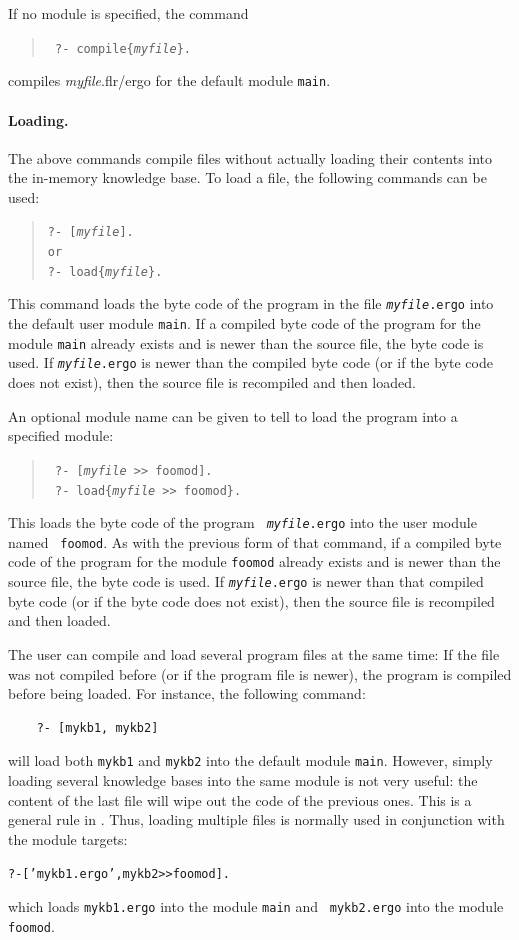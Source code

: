 \documentclass[11pt]{article}
\newcommand{\ERGO}{\mbox{\smaller{\ensuremath{\cal{E}}\smaller{{\sc{RGO}}}}}\xspace}
\newcommand{\FLSYSTEM}{\ERGO}
\newcommand{\flrext}{flr\xspace}
\newcommand{\ergoext}{ergo\xspace}
\begin{document}
If no module is specified, the command
\begin{quote}
 \tt
 ?- compile\{{\it myfile}\}.
\end{quote}
compiles {\it myfile}.\flrext/\ergoext for the default module {\tt main}.


\paragraph{Loading.}
%
The above commands compile files without actually loading their contents
into the in-memory knowledge base. 
To load a file, the following commands can be used:
\index{\tt [file]}
\begin{quote}
 \tt ?- [\textit{myfile}].  
 \\
 or
 \\
 \tt ?- load\{\textit{myfile}\}.
\end{quote}
This command loads the byte code of the program in the file {\tt \textit{myfile}.\ergoext} into the default user
module {\tt main}. If a compiled byte code of the program for the module
{\tt main} already exists and is newer than the source file, the byte code
is used.  If {\tt \textit{myfile}.\ergoext} is newer than the compiled byte code (or if
the byte code does not exist), then
the source file is recompiled and then loaded.

An optional module name can be given to tell \FLSYSTEM to
load the program into a specified module:
\begin{quote}
  \tt
    ?- [\textit{myfile} >{}> foomod].\\
    \tt
    ?- load\{\textit{myfile} >{}> foomod\}.
\end{quote}
This loads the byte code of the \FLSYSTEM program {\tt
  \textit{myfile}.\ergoext} into the user module named {\tt
  foomod}. As with the previous form of that command, if a compiled byte code of the program for the module
{\tt foomod} already exists and is newer than the source file, the byte code
is used.  If {\tt \textit{myfile}.\ergoext} is newer than that compiled byte code (or if
the byte code does not exist), then
the source file is recompiled and then loaded.

The user can compile and load several program
files at the same time: If the file was not compiled before (or if the
program file is newer), the program is compiled before being loaded.
For instance, the following command:
\begin{verbatim}
    ?- [mykb1, mykb2]
\end{verbatim}
will load both {\tt mykb1} and {\tt mykb2} into the default module
{\tt main}. However, simply loading several knowledge bases into the same module is not
very useful: the content of the last file will wipe out the code of the
previous ones. This is a general rule in \FLSYSTEM. Thus, loading
multiple files is normally used in conjunction with the module targets:
\begin{alltt}
    ?- ['mykb1.\ergoext', mykb2 >{}> foomod].
\end{alltt}
which loads {\tt mykb1.\ergoext} into the module {\tt main} and {\tt
  mykb2.\ergoext} into the module {\tt foomod}.
\end{document}
